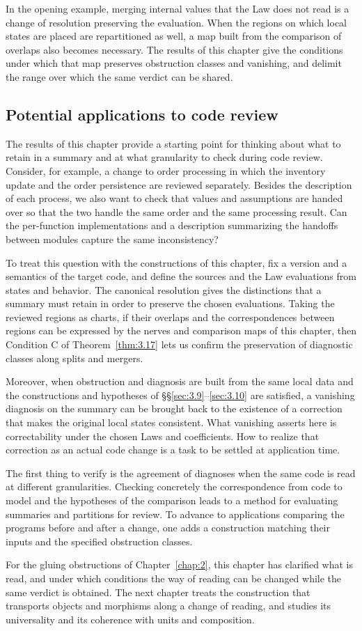 In the opening example, merging internal values that the Law does not read is a
change of resolution preserving the evaluation.
When the regions on which local states are placed are repartitioned as well, a map
built from the comparison of overlaps also becomes necessary.
The results of this chapter give the conditions under which that map preserves
obstruction classes and vanishing, and delimit the range over which the same verdict
can be shared.

\subsection*{Potential applications to code review}

The results of this chapter provide a starting point for thinking about what to
retain in a summary and at what granularity to check during code review.
Consider, for example, a change to order processing in which the inventory update
and the order persistence are reviewed separately.
Besides the description of each process, we also want to check that values and
assumptions are handed over so that the two handle the same order and the same
processing result.
Can the per-function implementations and a description summarizing the handoffs
between modules capture the same inconsistency?

To treat this question with the constructions of this chapter, fix a version and a
semantics of the target code, and define the sources and the Law evaluations from
states and behavior.
The canonical resolution gives the distinctions that a summary must retain in order
to preserve the chosen evaluations.
Taking the reviewed regions as charts, if their overlaps and the correspondences
between regions can be expressed by the nerves and comparison maps of this chapter,
then Condition C of Theorem~\ref{thm:3.17} lets us confirm the preservation of
diagnostic classes along splits and mergers.

Moreover, when obstruction and diagnosis are built from the same local data and the
constructions and hypotheses of \S\S\ref{sec:3.9}--\ref{sec:3.10} are satisfied, a
vanishing diagnosis on the summary can be brought back to the existence of a
correction that makes the original local states consistent.
What vanishing asserts here is correctability under the chosen Laws and
coefficients.
How to realize that correction as an actual code change is a task to be settled at
application time.

The first thing to verify is the agreement of diagnoses when the same code is read
at different granularities.
Checking concretely the correspondence from code to model and the hypotheses of the
comparison leads to a method for evaluating summaries and partitions for review.
To advance to applications comparing the programs before and after a change, one
adds a construction matching their inputs and the specified obstruction classes.

For the gluing obstructions of Chapter~\ref{chap:2}, this chapter has clarified what
is read, and under which conditions the way of reading can be changed while the
same verdict is obtained. The next chapter treats the construction that transports
objects and morphisms along a change of reading, and studies its universality and
its coherence with units and composition.
